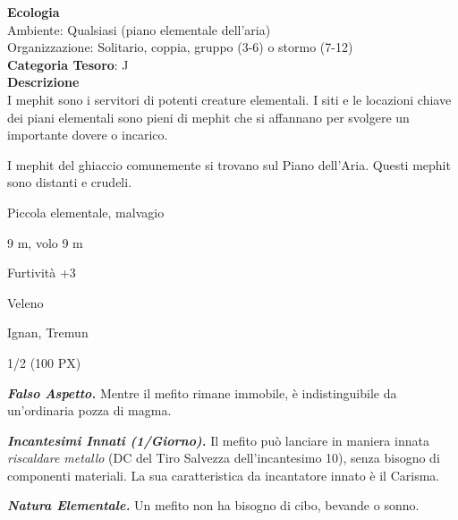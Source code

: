 \begin{multicols}{2}
{\textbf{Ecologia}\\
Ambiente: Qualsiasi (piano elementale dell'aria)\\
Organizzazione: Solitario, coppia, gruppo (3-6) o stormo (7-12)\\
\textbf{Categoria Tesoro}: J\\
\textbf{Descrizione}\\
I mephit sono i servitori di potenti creature elementali. I siti e le locazioni chiave dei piani elementali sono pieni di mephit che si affannano per svolgere un importante dovere o incarico.

I mephit del ghiaccio comunemente si trovano sul Piano dell'Aria. Questi mephit sono distanti e crudeli.

\begin{description}[noitemsep, topsep=0pt, parsep=0pt, partopsep=0pt, itemsep=1pt, leftmargin=2.35cm,  labelwidth=2.2cm, itemindent=0cm, listparindent=0pt] %
\setlength{\baselineskip}{10pt}
\item[\textbf{Taglia/Tipo}] Piccola elementale, malvagio
\item[\textbf{Caratt.}] 
\item[\textbf{Punti Ferita}] 
\item[\textbf{Movimento}] 9 m, volo 9 m
\item[\textbf{Tiri Salvez.}] 
\item[\textbf{Comp.}] Furtività +3
\item[\textbf{Imm. Danni}] Veleno
\item[\textbf{Sensi}] 
\item[\textbf{Linguaggi}] Ignan, Tremun
\item[\textbf{Sfida}] 1/2 (100 PX)
\end{description}
\smallskip

\emph{\textbf{Falso Aspetto.}} Mentre il mefito rimane immobile, è indistinguibile da un'ordinaria pozza di magma.

\emph{\textbf{Incantesimi Innati (1/Giorno).}} Il mefito può lanciare in maniera innata \emph{riscaldare metallo} (DC del Tiro Salvezza dell'incantesimo 10), senza bisogno di componenti materiali. La sua caratteristica da incantatore innato è il Carisma.

\emph{\textbf{Natura Elementale.}} Un mefito non ha bisogno di cibo, bevande o sonno.

}
\end{multicols}

